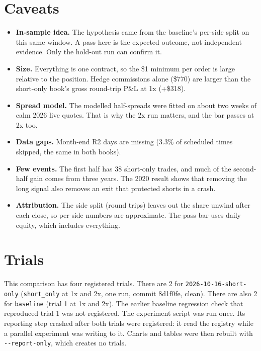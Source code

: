 \documentclass{article}
\begin{document}
\section{Caveats}

\begin{itemize}

\item \textbf{In-sample idea.} The hypothesis came from the baseline's per-side split on this same window. A pass here is the expected outcome, not independent evidence. Only the hold-out run can confirm it.

\item \textbf{Size.} Everything is one contract, so the \$1 minimum per order is large relative to the position. Hedge commissions alone (\$770) are larger than the short-only book's gross round-trip P\&L at 1x (+\$318).

\item \textbf{Spread model.} The modelled half-spreads were fitted on about two weeks of calm 2026 live quotes. That is why the 2x run matters, and the bar passes at 2x too.

\item \textbf{Data gaps.} Month-end R2 days are missing (3.3\% of scheduled times skipped, the same in both books).

\item \textbf{Few events.} The first half has 38 short-only trades, and much of the second-half gain comes from three years. The 2020 result shows that removing the long signal also removes an exit that protected shorts in a crash.

\item \textbf{Attribution.} The side split (round trips) leaves out the share unwind after each close, so per-side numbers are approximate. The pass bar uses daily equity, which includes everything.

\end{itemize}

\section{Trials}

This comparison has four registered trials. There are 2 for \texttt{2026-\allowbreak{}10-\allowbreak{}16-\allowbreak{}short-\allowbreak{}only} (\texttt{short\_\allowbreak{}only} at 1x and 2x, one run, commit 8d1f0fe, clean). There are also 2 for \texttt{baseline} (trial 1 at 1x and 2x). The earlier baseline regression check that reproduced trial 1 was not registered. The experiment script was run once. Its reporting step crashed after both trials were registered: it read the registry while a parallel experiment was writing to it. Charts and tables were then rebuilt with \texttt{-\allowbreak{}-\allowbreak{}report-\allowbreak{}only}, which creates no trials.
\end{document}

